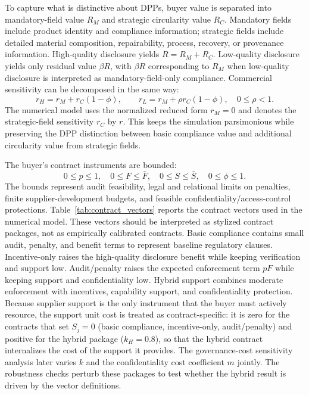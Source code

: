 \documentclass[final,5p,times,authoryear]{elsarticle}
\begin{document}
To capture what is distinctive about DPPs, buyer value is separated into mandatory-field value $R_M$ and strategic circularity value $R_C$. Mandatory fields include product identity and compliance information; strategic fields include detailed material composition, repairability, process, recovery, or provenance information. High-quality disclosure yields $R=R_M+R_C$. Low-quality disclosure yields only residual value $\beta R$, with $\beta R$ corresponding to $R_M$ when low-quality disclosure is interpreted as mandatory-field-only compliance. Commercial sensitivity can be decomposed in the same way:
\begin{equation}
r_H=r_M+r_C(1-\phi),\qquad r_L=r_M+\rho r_C(1-\phi),\quad 0\leq\rho<1.
\end{equation}
The numerical model uses the normalized reduced form $r_M=0$ and denotes the strategic-field sensitivity $r_C$ by $r$. This keeps the simulation parsimonious while preserving the DPP distinction between basic compliance value and additional circularity value from strategic fields.

The buyer's contract instruments are bounded:
\begin{equation}
0\leq p\leq 1,\quad 0\leq F\leq \bar{F},\quad 0\leq S\leq \bar{S},\quad 0\leq \phi\leq 1.
\end{equation}
The bounds represent audit feasibility, legal and relational limits on penalties, finite supplier-development budgets, and feasible confidentiality/access-control protections. Table~\ref{tab:contract_vectors} reports the contract vectors used in the numerical model. These vectors should be interpreted as stylized contract packages, not as empirically calibrated contracts. Basic compliance contains small audit, penalty, and benefit terms to represent baseline regulatory clauses. Incentive-only raises the high-quality disclosure benefit while keeping verification and support low. Audit/penalty raises the expected enforcement term $pF$ while keeping support and confidentiality low. Hybrid support combines moderate enforcement with incentives, capability support, and confidentiality protection. Because supplier support is the only instrument that the buyer must actively resource, the support unit cost is treated as contract-specific: it is zero for the contracts that set $S_j=0$ (basic compliance, incentive-only, audit/penalty) and positive for the hybrid package ($k_H=0.8$), so that the hybrid contract internalizes the cost of the support it provides. The governance-cost sensitivity analysis later varies $k$ and the confidentiality cost coefficient $m$ jointly. The robustness checks perturb these packages to test whether the hybrid result is driven by the vector definitions.
\end{document}

